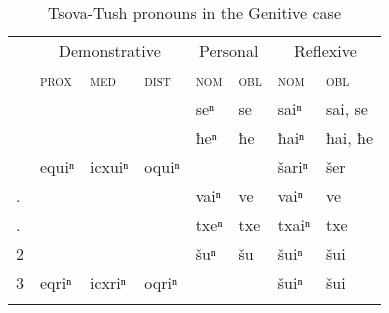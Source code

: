 \begin{table}
	\begin{tabular}{llllllll}
    \lsptoprule
		& \multicolumn{3}{c}{{Demonstrative}} & \multicolumn{2}{c}{{Personal}} & \multicolumn{2}{c}{{Reflexive}}  \\\cmidrule(lr){2-4}\cmidrule(lr){5-6}\cmidrule(lr){7-8} 
		
		& \textsc{{prox}} & \textsc{{med}} & \textsc{{dist}} &  \textsc{{nom}} & \textsc{{obl}} & \textsc{{nom}} & \textsc{{obl}} \\
		
		\midrule
		
		{\Fsg} & & & & seⁿ & se & saiⁿ & sai, se \\
		
		{\Ssg} & & & & ħeⁿ & ħe & ħaiⁿ & ħai, ħe \\
		
		{\Tsg} & equiⁿ & icxuiⁿ & oquiⁿ &  &  & šariⁿ & šer \\
		
		\midrule
		
		{\Fpl}.{\Incl} & & & & vaiⁿ & ve & vaiⁿ & ve \\
		
		{\Fpl}.{\Excl} & & & & txeⁿ & txe & txaiⁿ & txe \\
		
		2{\Pl} & & & &  šuⁿ & šu & šuiⁿ & šui \\
		
		3{\Pl} & eqriⁿ & icxriⁿ & oqriⁿ & & & šuiⁿ & šui \\
		\lspbottomrule
	\end{tabular}
	\caption{Tsova-Tush pronouns in the Genitive case}
	\label{tablepossadj}
\end{table}

